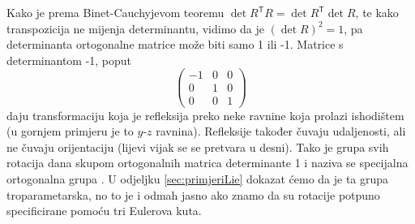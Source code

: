 Kako je prema Binet-Cauchyjevom teoremu $\det R^\mathsf{T} R = \det R^\mathsf{T} \det R$,
te kako transpozicija ne mijenja determinantu, vidimo da je $(\det R)^2 = 1$,
pa determinanta ortogonalne matrice može biti samo 1 ili -1.
Matrice s determinantom -1, poput 
\begin{equation}
    \begin{pmatrix}
    -1 & 0 & 0 \\
     0 & 1 & 0 \\
     0 & 0 & 1 
    \end{pmatrix}
\end{equation}
daju transformaciju koja je refleksija preko neke ravnine koja
prolazi ishodištem (u gornjem primjeru je to $y$-$z$ ravnina). Refleksije također čuvaju
udaljenosti, ali ne čuvaju orijentaciju (lijevi vijak se
se pretvara u desni). Tako je grupa svih rotacija dana skupom ortogonalnih
matrica determinante 1 i naziva se specijalna ortogonalna grupa .
U odjeljku \ref{sec:primjeriLie} dokazat ćemo da je ta grupa troparametarska,
no to je i odmah jasno ako znamo da su rotacije potpuno specificirane pomoću
tri Eulerova kuta.

